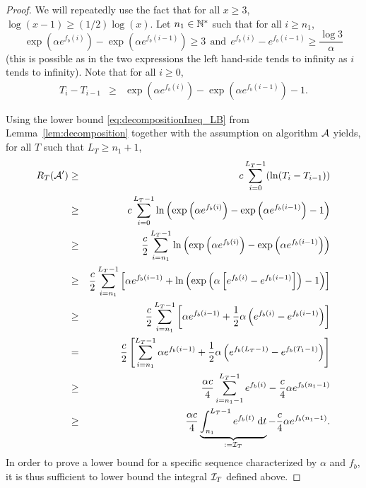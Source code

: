 \documentclass[12pt]{colt2018} %
\begin{document}
\begin{proof}

We will repeatedly use the fact that for all $x \geq 3$, $\log (x-1) \geq (1/2)\log(x)$. Let $n_1 \in \mathbb{N}^*$ such that for all $i \geq n_1$,
\[\exp\left(\alpha e^{f_b(i)}\right) - \exp\left(\alpha e^{f_b(i-1)}\right) \geq 3 \ \ \text{and} \ \ e^{f_b(i)} - e^{f_b(i-1)} \geq \frac{\log 3}{\alpha}\]
(this is possible as in the two expressions the left hand-side tends to infinity as $i$ tends to infinity).
Note that for all $i\geq 0$,
\begin{eqnarray*}
    T_{i} - T_{i-1} & \geq & \exp\left(\alpha e^{f_b(i)}\right) - \exp\left(\alpha e^{f_b(i-1)}\right) - 1.
\end{eqnarray*}

Using the lower bound \eqref{eq:decompositionIneq_LB} from Lemma~\ref{lem:decomposition} together with the assumption on algorithm $\mathcal{A}$ yields, for all $T$ such that $L_T \geq n_1 + 1$,
\begin{eqnarray*}
    R_T(\mathcal{A}') & \geq & c\sum_{i=0}^{L_T-1} (\ln(T_i - T_{i-1})) \\
    & \geq & c\sum_{i=0}^{L_T-1} \ln\left(\exp\left(\alpha e^{f_b(i)}\right) - \exp\left(\alpha e^{f_b(i-1)}\right) - 1\right)\\
    & \geq & \frac{c}{2}\sum_{i=n_1}^{L_T-1} \ln\left(\exp\left(\alpha e^{f_b(i)}\right) - \exp\left(\alpha e^{f_b(i-1)}\right)\right)\\
    & \geq & \frac{c}{2}\sum_{i=n_1}^{L_T-1}\left[\alpha e^{f_b(i-1)} + \ln \left(\exp\left(\alpha \left[e^{f_b(i)} - e^{f_b(i-1)}\right]\right) - 1\right)\right] \\
    & \geq & \frac{c}{2}\sum_{i=n_1}^{L_T-1}\left[\alpha e^{f_b(i-1)} + \frac{1}{2} \alpha \left(e^{f_b(i)} - e^{f_b(i-1)}\right)\right] \\
    & = & \frac{c}{2} \left[\sum_{i=n_1}^{L_T-1}\alpha e^{f_b(i-1)} + \frac{1}{2} \alpha \left(e^{f_b(L_T-1)} - e^{f_b(T_1-1)}\right)\right] \\
    & \geq & \frac{\alpha c}{4}\sum_{i=n_1-1}^{L_T-1} e^{f_b(i)} - \frac{c}{4}\alpha e^{f_b(n_1-1)} \\
    & \geq & \frac{\alpha c}{4}\underbrace{\int_{n_1}^{L_T-1} e^{f_b(t)} \;\mathrm{d}t}_{:=\mathcal{I}_T} - \frac{c}{4}\alpha e^{f_b(n_1-1)}.
\end{eqnarray*}
In order to prove a lower bound for a specific sequence characterized by $\alpha$ and $f_b$, it is thus sufficient to lower bound the integral $\mathcal{I}_T$ defined above.


\end{proof}
\end{document}
